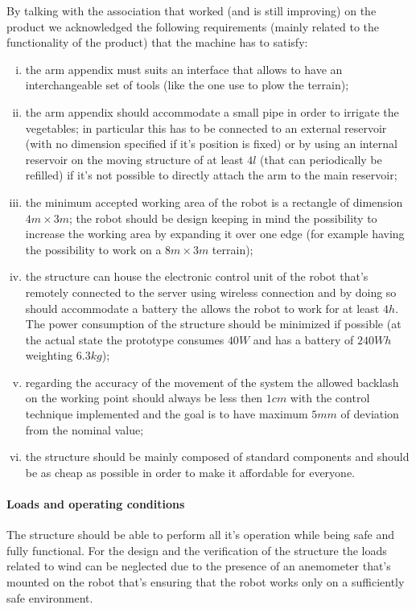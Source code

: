 	By talking with the association that worked (and is still improving) on the product we acknowledged the following requirements (mainly related to the functionality of the product) that the machine has to satisfy:
	\begin{enumerate}[i)]
		\item the arm appendix must suits an interface that allows to have an interchangeable set of tools (like the one use to plow the terrain);
		
		\item the arm appendix should accommodate a small pipe in order to irrigate the vegetables; in particular this has to be connected to an external reservoir (with no dimension specified if it's position is fixed) or by using an internal reservoir on the moving structure of at least $4l$ (that can periodically be refilled) if it's not possible to directly attach the arm to the main reservoir;
		
		\item the minimum accepted working area of the robot is a rectangle of dimension $4m\times 3m$; the robot should be design keeping in mind the possibility to increase the working area by expanding it over one edge (for example having the possibility to work on a $8m\times 3m$ terrain);
		
		\item the structure can house the electronic control unit of the robot that's remotely connected to the server using wireless connection and by doing so should accommodate a battery the allows the robot to work for at least $4h$. The power consumption of the structure should be minimized if possible (at the actual state the prototype consumes $40W$ and has a battery of $240 Wh$ weighting $6.3kg$);
		
		\item regarding the accuracy of the movement of the system the allowed backlash on the working point should always be less then $1cm$ with the control technique implemented and the goal is to have maximum $5mm$ of deviation from the nominal value;
		
		\item the structure should be mainly composed of standard components and should be as cheap as possible in order to make it affordable for everyone.
	\end{enumerate}

	\paragraph{Loads and operating conditions} The structure should be able to perform all it's operation while being safe and fully functional. For the design and the verification of the structure the loads related to wind can be neglected due to the presence of an anemometer that's mounted on the robot that's ensuring that the robot works only on a sufficiently safe environment.
	
